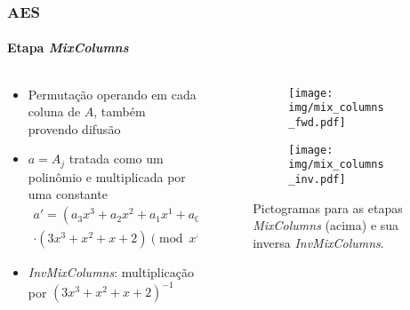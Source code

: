 \documentclass[12pt]{beamer}
\begin{document}
\begin{frame}
    \frametitle{AES}
    \framesubtitle{Etapa \emph{MixColumns}}
    \begin{columns}[T]
        \begin{column}{.7\textwidth}
          \begin{itemize}
            \item Permutação operando em cada coluna de $A$, também provendo difusão
            \item $a = A_j$ tratada como um polinômio e multiplicada por uma constante
            \begin{multline*}
                a' = (a_3 x^3 + a_2 x^2 + a_1 x^1 + a_0 x^0) \\
                \cdot (3 x^3 + x^2 + x + 2) \pmod{x^4 + 1}
            \end{multline*}
            \item \emph{InvMixColumns}: multiplicação por $(3 x^3 + x^2 + x + 2)^{-1}$
          \end{itemize}
        \end{column}
        \begin{column}{.25\textwidth}
            \begin{figure}
            \centering
            \begin{subfigure}[b]{0.7\textwidth}
               \texttt{[image: img/mix\_columns\_fwd.pdf]}
               \vspace{2mm}
            \end{subfigure}
            
            \begin{subfigure}[b]{0.7\textwidth}
               \texttt{[image: img/mix\_columns\_inv.pdf]}
            \end{subfigure}
                    \captionsetup{font=scriptsize}
        
            \caption*{Pictogramas para as etapas \emph{MixColumns} (acima) e sua inversa \emph{InvMixColumns}.}
            \end{figure}
        \end{column}
    \end{columns}
\end{frame}
\end{document}
